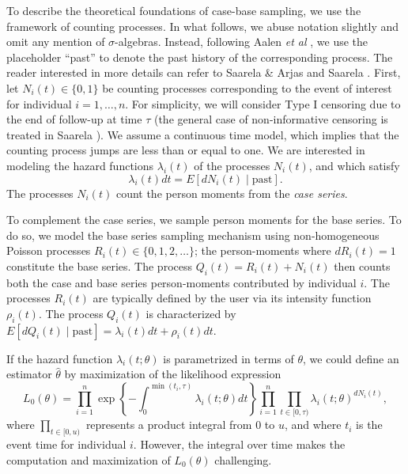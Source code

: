 To describe the theoretical foundations of case-base sampling, we use
the framework of counting processes. In what follows, we abuse notation
slightly and omit any mention of \(\sigma\)-algebras. Instead, following
Aalen \textit{et al} \citeyearpar{aalen2008survival}, we use the
placeholder ``past'' to denote the past history of the corresponding
process. The reader interested in more details can refer to Saarela \&
Arjas \citeyearpar{saarela2015non} and Saarela
\citeyearpar{saarela2016case}. First, let \(N_{i}(t) \in \{0, 1\}\) be
counting processes corresponding to the event of interest for individual
\(i=1, \ldots,n\). For simplicity, we will consider Type I censoring due
to the end of follow-up at time \(\tau\) (the general case of
non-informative censoring is treated in Saarela
\citeyearpar{saarela2016case}). We assume a continuous time model, which
implies that the counting process jumps are less than or equal to one.
We are interested in modeling the hazard functions \(\lambda_{i}(t)\) of
the processes \(N_i(t)\), and which satisfy
\[\lambda_{i}(t) dt = E[dN_{i}(t)\mid \mathrm{past}].\] The processes
\(N_i(t)\) count the person moments from the \emph{case series}.

To complement the case series, we sample person moments for the base
series. To do so, we model the base series sampling mechanism using
non-homogeneous Poisson processes \(R_i(t) \in \{0, 1, 2, \ldots\}\);
the person-moments where \(dR_i(t) = 1\) constitute the base series. The
process \(Q_{i}(t) = R_i(t) + N_{i}(t)\) then counts both the case and
base series person-moments contributed by individual \(i\). The
processes \(R_i(t)\) are typically defined by the user via its intensity
function \(\rho_i(t)\). The process \(Q_{i}(t)\) is characterized by
\(E[dQ_{i}(t)\mid\mathrm{past}] = \lambda_{i}(t)dt + \rho_i(t)dt\).

If the hazard function \(\lambda_{i}(t; \theta)\) is parametrized in
terms of \(\theta\), we could define an estimator \(\hat{\theta}\) by
maximization of the likelihood expression
\[L_0(\theta) = \prod_{i=1}^n \exp\left\{ -\int_0^{\min(t_i,\tau)} \lambda_i(t; \theta) dt \right\} \prod_{i=1}^{n} \prod_{t\in[0,\tau)} \lambda_{i}(t;\theta)^{dN_{i}(t)},\]
where \(\prod_{t\in[0,u)}\) represents a product integral from \(0\) to
\(u\), and where \(t_i\) is the event time for individual \(i\).
However, the integral over time makes the computation and maximization
of \(L_0(\theta)\) challenging.

